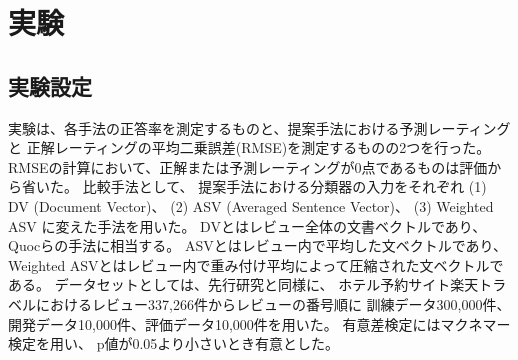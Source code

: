 \section{実験} \label{sec:Experiments}

\subsection{実験設定}

実験は、各手法の正答率を測定するものと、提案手法における予測レーティングと
正解レーティングの平均二乗誤差(RMSE)を測定するものの2つを行った。
RMSEの計算において、正解または予測レーティングが0点であるものは評価から省いた。
比較手法として、
提案手法における分類器の入力をそれぞれ
(1) DV (Document Vector)、
(2) ASV (Averaged Sentence Vector)、
(3) Weighted ASV
に変えた手法を用いた。
DVとはレビュー全体の文書ベクトルであり、
Quocら\cite{quoc14}の手法に相当する。
ASVとはレビュー内で平均した文ベクトルであり、
Weighted ASVとはレビュー内で重み付け平均によって圧縮された文ベクトルである。
データセットとしては、先行研究\cite{fujitani15}と同様に、
ホテル予約サイト楽天トラベルにおけるレビュー337,266件からレビューの番号順に
訓練データ300,000件、開発データ10,000件、評価データ10,000件を用いた。
有意差検定にはマクネマー検定を用い、
p値が0.05より小さいとき有意とした。



